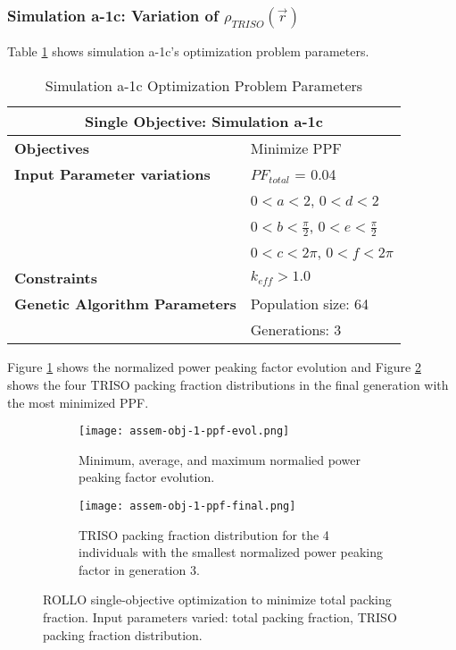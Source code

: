 \subsubsection{Simulation a-1c: Variation of $\rho_{TRISO}(\vec{r})$}
Table \ref{tab:simulationa1c} shows simulation a-1c's optimization problem parameters. 
\begin{table}[htbp]
    \centering
    \onehalfspacing
    \caption{Simulation a-1c Optimization Problem Parameters}
	\label{tab:simulationa1c}
    \footnotesize
    \begin{tabular}{l|p{3cm}}
    \hline 
    \multicolumn{2}{c}{\textbf{Single Objective: Simulation a-1c}} \\
    \hline 
    \textbf{Objectives} & Minimize PPF \\
    \hline 
    \textbf{Input Parameter variations}
    & $PF_{total}$ = 0.04 \\
    & $0<a<2$, $0<d<2$\\
    & $0<b<\frac{\pi}{2}$, $0<e<\frac{\pi}{2}$\\
    & $0<c<2\pi$, $0<f<2\pi$\\
    \hline
    \textbf{Constraints} & $k_{eff} > 1.0$\\ 
    \hline 
    \textbf{Genetic Algorithm Parameters} & Population size: 64 \\
    & Generations: 3 \\
    \hline
    \end{tabular}
\end{table}
Figure \ref{fig:assem-obj-1-ppf-evol} shows the normalized power peaking factor evolution 
and Figure \ref{fig:assem-obj-1-ppf-final} shows the four TRISO packing fraction distributions in 
the final generation with the most minimized PPF. 
\begin{figure}[htbp]
    \centering
    \begin{subfigure}{\textwidth}
        \texttt{[image: assem-obj-1-ppf-evol.png]}
        \caption{Minimum, average, and maximum normalied power peaking factor evolution.}
        \label{fig:assem-obj-1-ppf-evol} 
    \end{subfigure}
    \begin{subfigure}{\textwidth}
        \texttt{[image: assem-obj-1-ppf-final.png]}
        \caption{TRISO packing fraction distribution for the 4 individuals with the 
        smallest normalized power peaking factor in generation 3.}
        \label{fig:assem-obj-1-ppf-final} 
    \end{subfigure}
    \caption{ROLLO single-objective optimization to minimize total packing fraction. 
    Input parameters varied: total packing fraction, TRISO packing fraction distribution.}
    \label{fig:assem-obj-1-ppf}
\end{figure}

